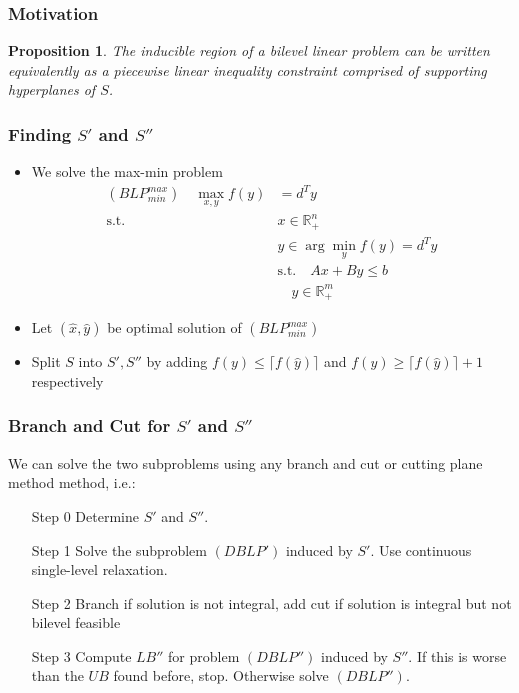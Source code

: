 \documentclass[11pt]{beamer}
\newtheorem{theo}{Proposition}
\begin{document}
\begin{frame}
	\frametitle{Motivation}
	\begin{theo}
		The inducible region of a bilevel linear problem can be written equivalently as a piecewise linear inequality constraint comprised of supporting hyperplanes of $S$.
	\end{theo}
	
	
\end{frame}

\begin{frame}
	\frametitle{Finding $S'$ and $S''$}
	\begin{itemize}
	\item We solve the max-min problem
		\begin{align*}
			(BLP^{max}_{min}) \quad \max_{x,y} f(y) &= d^T y \\
			\text{s.t.} \quad &x \in \mathbb{R}^n_{+} \\
			&y \in \arg \min_{y} f(y) = d^Ty \\
			&\text{s.t.} \quad Ax + By \le b \\
			& \quad y \in \mathbb{R}^m_{+}
		\end{align*}
		\item Let $(\hat x, \hat y)$ be optimal solution of $(BLP^{max}_{min})$
		\item Split $S$ into $S', S''$ by adding $f(y) \le \lceil f(\hat y) \rceil$ and $f(y) \ge \lceil f(\hat y) \rceil + 1$ respectively
	\end{itemize}
\end{frame}

\begin{frame}
	\frametitle{Branch and Cut for $S'$ and $S''$}
	We can solve the two subproblems using any branch and cut or cutting plane method method, i.e.:
	\begin{itemize}
		\item[Step 0]Determine $S'$ and $S''$.
		\item[Step 1]Solve the subproblem $(DBLP')$ induced by $S'$. Use continuous single-level relaxation. 
		\item[Step 2]Branch if solution is not integral, add cut if solution is integral but not bilevel feasible
		\item[Step 3]Compute $LB''$ for problem $(DBLP'')$ induced by $S''$. If this is worse than the $UB$ found before, stop.
		Otherwise solve $(DBLP'')$.
	\end{itemize}
\end{frame}
\end{document}
